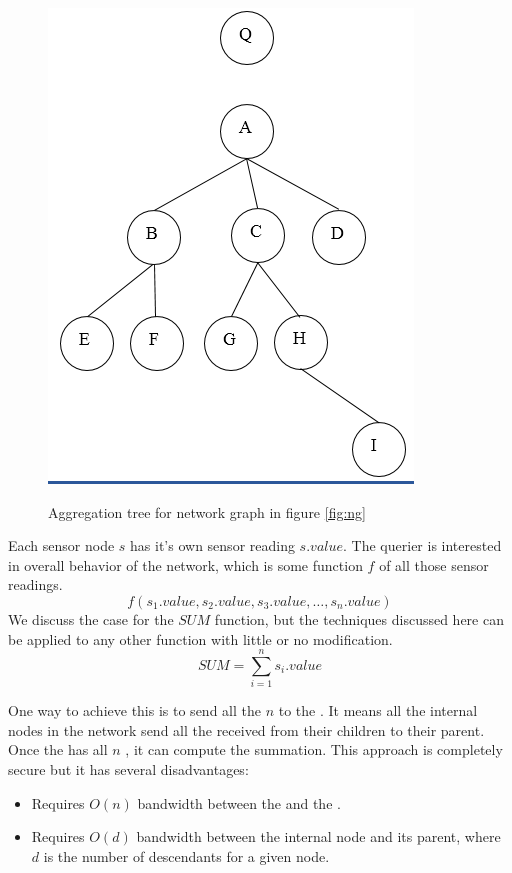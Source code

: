 		\begin{figure}[hp]
			\centering
			\includegraphics[scale = 0.6]{images/aggregation-tree.png}\\
			\caption{Aggregation tree for network graph in figure \ref{fig:ng}}
			\label{fig:at}
		\end{figure}

		Each sensor node $s$ has it's own sensor reading $s.value$. The querier is interested in overall behavior of the network, which is some function $f$ of all those sensor readings.
		\begin{equation}
			f(s_{1}.value, s_{2}.value, s_{3}.value, \dotsc, s_{n}.value)
		\end{equation}
		We discuss the case for the $SUM$ function, but the techniques discussed here can be applied to any other function with little or no modification. 
		\begin{equation}
			SUM = \sum\limits_{i=1}^n s_{i}.value
		\end{equation}

		One way to achieve this is to send all the $n$ \payloads to the \q.
		It means all the internal nodes in the network send all the \payloads received from their children to their parent.
		Once the \q has all $n$ \payloads, it can compute the summation.  
		This approach is completely secure but it has several disadvantages:
		\begin{itemize}
			\item Requires $O(n)$ bandwidth between the \bs and the \q.
			\item Requires $O(d)$ bandwidth between the internal node and its parent, where $d$ is the number of descendants for a given node.
		\end{itemize}
		
